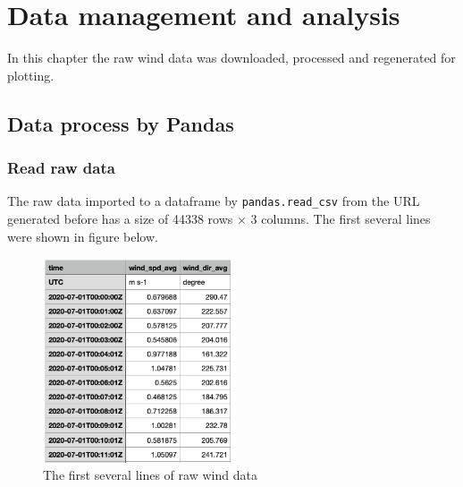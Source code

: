 \documentclass[10pt]{report}
\begin{document}
\chapter{Data management and analysis}
In this chapter the raw wind data was downloaded, processed and regenerated for plotting.

\section{Data process by Pandas}

\subsection{Read raw data}
The raw data imported to a dataframe by \texttt{pandas.read\_csv} from the URL generated before has a size of 44338 rows $\times$ 3 columns. The first several lines were shown in figure below.

\begin{figure}[h!]
    \centering
    \includegraphics[width=0.50\textwidth]{images/raw_data.png}
    \caption{The first several lines of raw wind data}
    \label{fig: PaleBlueDot}    
\end{figure}
\end{document}
